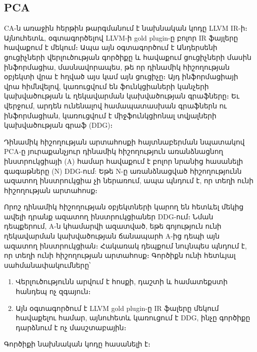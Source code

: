 \subsection{PCA}
CA\cite{Li2020}-ն առաջին հերթին թարգմանում է նախնական կոդը LLVM IR-ի։ Այնուհետև, օգտագործելով LLVM-ի gold plugin-ը
բոլոր IR ֆայլերը հավաքում է մեկում։ Ապա այն օգտագործում է Անդերսենի ցուցիչների վերլուծության գործիքը\cite{Andersen}
և հավաքում ցուցիչների մասին ինֆորմացիա, մասնավորապես, թե որ դինամիկ հիշողության օբյեկտի վրա է հղված այս կամ այն ցուցիչը։
Այդ ինֆորմացիայի վրա հիմնվելով, կառուցվում են ֆունկցիաների կանչերի կախվածության և ղեկավարման կախվածության գրաֆները։
Եւ վերջում, արդեն ունենալով համապատասխան գրաֆներն ու ինֆորմացիան, կառուցվում է միջֆունկցիոնալ տվյալների կախվածության գրաֆ (DDG)։

Դինամիկ հիշողության արտահոսքի հայտնաբերման նպատակով PCA-ը յուրաքանչյուր դինամիկ հիշողություն առանձնացնող ինստրուկցիայի (A)
համար հավաքում է բոլոր նրանից հասանելի գագաթները (N) DDG-ում: Եթե N-ը առանձնացված հիշողությունն ազատող ինստրուկցիա
չի ներառում, ապա պնդում է, որ տեղի ունի հիշողության արտահոսք։

Որոշ դինամիկ հիշողության օբյեկտների կարող են հետևել մեկից ավելի դրանք ազատող ինստրուկցիաներ DDG-ում։
Նման դեպքերում, A-ն կհամարվի ազատված, եթե գոյություն ունի ղեկավարման կախվածության ճանապարհ A-ից դեպի այն ազատող
ինստրուկցիան։ Հակառակ դեպքում նույնպես պնդում է, որ տեղի ունի հիշողության արտահոսք։ Գործիքն ունի հետևյալ սահմանափակումները՝
\begin{enumerate}
    \item Վերլուծությունն արվում է հոսքի, դաշտի և համատեքստի հանդեպ ոչ զգայուն։
    \item Այն օգտագործում է LLVM gold plugin-ը IR ֆալերը մեկում հավաքելու համար, այնուհետև կառուցում է DDG, ինչը գործիքը
    դարձնում է ոչ մասշտաբային։
\end{enumerate}

Գործիքի նախնական կոդը հասանելի է\cite{PCA}։
